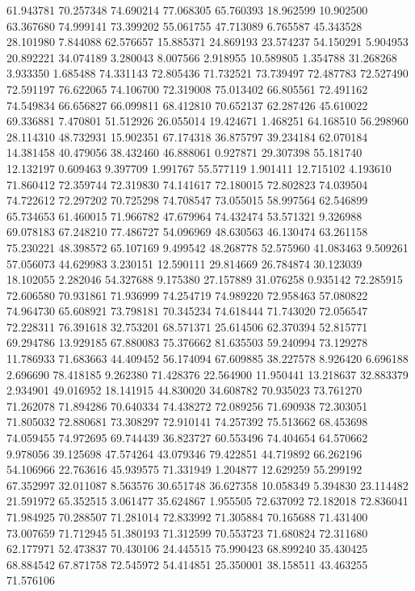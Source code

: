 61.943781
70.257348
74.690214
77.068305
65.760393
18.962599
10.902500
63.367680
74.999141
73.399202
55.061755
47.713089
6.765587
45.343528
28.101980
7.844088
62.576657
15.885371
24.869193
23.574237
54.150291
5.904953
20.892221
34.074189
3.280043
8.007566
2.918955
10.589805
1.354788
31.268268
3.933350
1.685488
74.331143
72.805436
71.732521
73.739497
72.487783
72.527490
72.591197
76.622065
74.106700
72.319008
75.013402
66.805561
72.491162
74.549834
66.656827
66.099811
68.412810
70.652137
62.287426
45.610022
69.336881
7.470801
51.512926
26.055014
19.424671
1.468251
64.168510
56.298960
28.114310
48.732931
15.902351
67.174318
36.875797
39.234184
62.070184
14.381458
40.479056
38.432460
46.888061
0.927871
29.307398
55.181740
12.132197
0.609463
9.397709
1.991767
55.577119
1.901411
12.715102
4.193610
71.860412
72.359744
72.319830
74.141617
72.180015
72.802823
74.039504
74.722612
72.297202
70.725298
74.708547
73.055015
58.997564
62.546899
65.734653
61.460015
71.966782
47.679964
74.432474
53.571321
9.326988
69.078183
67.248210
77.486727
54.096969
48.630563
46.130474
63.261158
75.230221
48.398572
65.107169
9.499542
48.268778
52.575960
41.083463
9.509261
57.056073
44.629983
3.230151
12.590111
29.814669
26.784874
30.123039
18.102055
2.282046
54.327688
9.175380
27.157889
31.076258
0.935142
72.285915
72.606580
70.931861
71.936999
74.254719
74.989220
72.958463
57.080822
74.964730
65.608921
73.798181
70.345234
74.618444
71.743020
72.056547
72.228311
76.391618
32.753201
68.571371
25.614506
62.370394
52.815771
69.294786
13.929185
67.880083
75.376662
81.635503
59.240994
73.129278
11.786933
71.683663
44.409452
56.174094
67.609885
38.227578
8.926420
6.696188
2.696690
78.418185
9.262380
71.428376
22.564900
11.950441
13.218637
32.883379
2.934901
49.016952
18.141915
44.830020
34.608782
70.935023
73.761270
71.262078
71.894286
70.640334
74.438272
72.089256
71.690938
72.303051
71.805032
72.880681
73.308297
72.910141
74.257392
75.513662
68.453698
74.059455
74.972695
69.744439
36.823727
60.553496
74.404654
64.570662
9.978056
39.125698
47.574264
43.079346
79.422851
44.719892
66.262196
54.106966
22.763616
45.939575
71.331949
1.204877
12.629259
55.299192
67.352997
32.011087
8.563576
30.651748
36.627358
10.058349
5.394830
23.114482
21.591972
65.352515
3.061477
35.624867
1.955505
72.637092
72.182018
72.836041
71.984925
70.288507
71.281014
72.833992
71.305884
70.165688
71.431400
73.007659
71.712945
51.380193
71.312599
70.553723
71.680824
72.311680
62.177971
52.473837
70.430106
24.445515
75.990423
68.899240
35.430425
68.884542
67.871758
72.545972
54.414851
25.350001
38.158511
43.463255
71.576106
